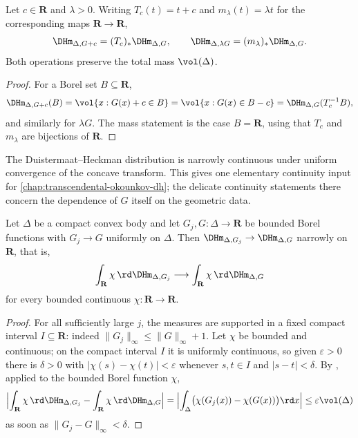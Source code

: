 \begin{corollary}
\label{cor:dh-affine}
Let $c\in\mathbf R$ and $\lambda>0$.  Writing $T_c(t)=t+c$ and
$m_\lambda(t)=\lambda t$ for the corresponding maps $\mathbf R\to\mathbf R$,
\[
 \DHm_{\Delta,G+c}=(T_c)_*\DHm_{\Delta,G},
 \qquad
 \DHm_{\Delta,\lambda G}=(m_\lambda)_*\DHm_{\Delta,G}.
\]
Both operations preserve the total mass $\vol(\Delta)$.
\end{corollary}

\begin{proof}
For a Borel set $B\subseteq\mathbf R$,
\[
 \DHm_{\Delta,G+c}(B)=\vol\{x:G(x)+c\in B\}
 =\vol\{x:G(x)\in B-c\}=\DHm_{\Delta,G}(T_c^{-1}B),
\]
and similarly for $\lambda G$.  The mass statement is the case
$B=\mathbf R$, using that $T_c$ and $m_\lambda$ are bijections of
$\mathbf R$.
\end{proof}

The Duistermaat--Heckman distribution is narrowly continuous under uniform
convergence of the concave transform.  This gives one elementary continuity
input for \cref{chap:transcendental-okounkov-dh}; the
delicate continuity statements there concern the dependence of $G$ itself on
the geometric data.

\begin{proposition}
\label{prop:dh-continuity}
Let $\Delta$ be a compact convex body and let $G_j,G:\Delta\to\mathbf R$ be
bounded Borel functions with $G_j\to G$ uniformly on $\Delta$.  Then
$\DHm_{\Delta,G_j}\to\DHm_{\Delta,G}$ narrowly on $\mathbf R$, that is,
\[
 \int_{\mathbf R}\chi\,\rd\DHm_{\Delta,G_j}
 \longrightarrow
 \int_{\mathbf R}\chi\,\rd\DHm_{\Delta,G}
\]
for every bounded continuous $\chi:\mathbf R\to\mathbf R$.
\end{proposition}

\begin{proof}
For all sufficiently large $j$, the measures are supported in a fixed
compact interval $I\subseteq\mathbf R$: indeed
$\lVert G_j\rVert_\infty\leq\lVert G\rVert_\infty+1$.
Let $\chi$ be bounded and continuous; on the compact interval $I$ it is
uniformly continuous, so given $\varepsilon>0$ there is $\delta>0$ with
$|\chi(s)-\chi(t)|<\varepsilon$ whenever $s,t\in I$ and $|s-t|<\delta$.  By
, applied to the bounded Borel function $\chi$,
\[
 \Bigl|\int_{\mathbf R}\chi\,\rd\DHm_{\Delta,G_j}
 -\int_{\mathbf R}\chi\,\rd\DHm_{\Delta,G}\Bigr|
 =\Bigl|\int_\Delta\bigl(\chi(G_j(x))-\chi(G(x))\bigr)\rd x\Bigr|
 \leq\varepsilon\vol(\Delta)
\]
as soon as $\lVert G_j-G\rVert_\infty<\delta$.
\end{proof}

